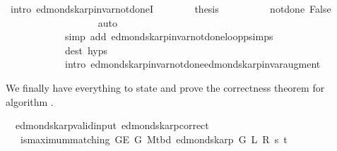 \begin{isabellebody}
\ {\isacharparenleft}{\kern0pt}intro\ edmonds{\isacharunderscore}{\kern0pt}karp{\isacharunderscore}{\kern0pt}invar{\isacharunderscore}{\kern0pt}not{\isacharunderscore}{\kern0pt}done{\isacharunderscore}{\kern0pt}{}I{\isacharunderscore}{\kern0pt}{}{\isacharparenright}{\kern0pt}\isanewline
\ \ \ \ \ \ \isamarkupfalse%
\ {\isacharquery}{\kern0pt}thesis\isanewline
\ \ \ \ \ \ \ \ \isamarkupfalse%
\ not{\isacharunderscore}{\kern0pt}done{\isacharunderscore}{\kern0pt}{}\ False\isanewline
\ \ \ \ \ \ \ \ \isamarkupfalse%
\isanewline
\ \ \ \ \ \ \ \ \ \ {\isacharparenleft}{\kern0pt}auto\isanewline
\ \ \ \ \ \ \ \ \ \ \ \ simp\ add{\isacharcolon}{\kern0pt}\ edmonds{\isacharunderscore}{\kern0pt}karp{\isacharunderscore}{\kern0pt}invar{\isacharunderscore}{\kern0pt}not{\isacharunderscore}{\kern0pt}done{\isacharunderscore}{\kern0pt}{}{\isachardot}{\kern0pt}loop{\isacharprime}{\kern0pt}{\isacharunderscore}{\kern0pt}psimps\isanewline
\ \ \ \ \ \ \ \ \ \ \ \ dest{\isacharcolon}{\kern0pt}\ {\isachardoublequoteopen}{}{\isachardot}{\kern0pt}hyps{\isachardoublequoteclose}\isanewline
\ \ \ \ \ \ \ \ \ \ \ \ intro{\isacharcolon}{\kern0pt}\ edmonds{\isacharunderscore}{\kern0pt}karp{\isacharunderscore}{\kern0pt}invar{\isacharunderscore}{\kern0pt}not{\isacharunderscore}{\kern0pt}done{\isacharunderscore}{\kern0pt}{}{\isachardot}{\kern0pt}edmonds{\isacharunderscore}{\kern0pt}karp{\isacharunderscore}{\kern0pt}invar{\isacharunderscore}{\kern0pt}augment{\isacharparenright}{\kern0pt}\isanewline
\ \ \ \ \isamarkupfalse%
\isanewline
\ \ \isamarkupfalse%
\isanewline
{}\isamarkupfalse%
%
\endisatagvisible
{\isafoldvisible}%
%
\isadelimvisible
%
\endisadelimvisible
%
\begin{isamarkuptext}%
We finally have everything to state and prove the correctness theorem for algorithm
.%
\end{isamarkuptext}\isamarkuptrue%
\isamarkupfalse%
\ {\isacharparenleft}{\kern0pt}\ edmonds{\isacharunderscore}{\kern0pt}karp{\isacharunderscore}{\kern0pt}valid{\isacharunderscore}{\kern0pt}input{\isacharparenright}{\kern0pt}\ edmonds{\isacharunderscore}{\kern0pt}karp{\isacharunderscore}{\kern0pt}correct{\isacharcolon}{\kern0pt}\isanewline
\ \ \ {\isachardoublequoteopen}is{\isacharunderscore}{\kern0pt}maximum{\isacharunderscore}{\kern0pt}matching\ {\isacharparenleft}{\kern0pt}G{\isachardot}{\kern0pt}E\ G{\isacharparenright}{\kern0pt}\ {\isacharparenleft}{\kern0pt}M{\isacharunderscore}{\kern0pt}tbd\ {\isacharparenleft}{\kern0pt}edmonds{\isacharunderscore}{\kern0pt}karp\ G\ L\ R\ s\ t{\isacharparenright}{\kern0pt}{\isacharparenright}{\kern0pt}{\isachardoublequoteclose}\isanewline

\end{isabellebody}
